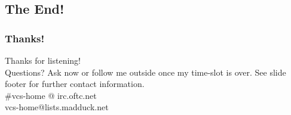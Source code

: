\documentclass[t]{beamer}
\begin{document}
\subsection{The End!}

\begin{frame}
	\frametitle{Thanks!}
		\begin{center}
			\vfill
			Thanks for listening!\\
			\vfill
			Questions? Ask now or follow me outside once my time-slot is over.
			\vfill
			See slide footer for further contact information.\\
			\vfill
			\#vcs-home @ irc.oftc.net\\
			vcs-home@lists.madduck.net
			\vfill
		\end{center}
\end{frame}
\end{document}
